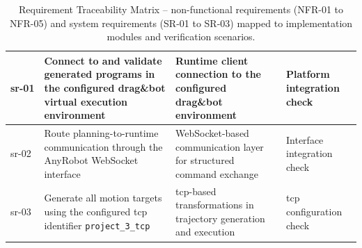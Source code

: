 \begin{landscape}
\begin{table}[p]
\begin{tabular}{
L{1.8cm}
L{6.0cm}
L{9.0cm}
L{5.5cm}
}
\acs{sr}-01 &
Connect to and validate generated programs in the configured drag\&bot virtual execution environment &
Runtime client connection to the configured drag\&bot environment &
Platform integration check \\
\hline

\acs{sr}-02 &
Route planning-to-runtime communication through the AnyRobot WebSocket interface &
WebSocket-based communication layer for structured command exchange &
Interface integration check \\
\hline

\acs{sr}-03 &
Generate all motion targets using the configured \ac{tcp} identifier \texttt{project\_3\_tcp} &
\acs{tcp}-based transformations in trajectory generation and execution &
\acs{tcp} configuration check \\

\hline
\end{tabular}

\caption[Requirement Traceability Matrix -- non-functional and system requirements]{Requirement Traceability Matrix -- non-functional requirements (NFR-01 to NFR-05) and system requirements (SR-01 to SR-03) mapped to implementation modules and verification scenarios.}
\label{tab:req-traceability-matrix-nfr-sr}

\end{table}

\end{landscape}
